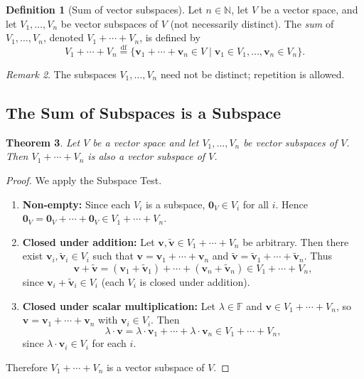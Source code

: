 \documentclass[11pt, a4paper, notitlepage]{report}
\newtheorem{theorem}{Theorem}[section]
\theoremstyle{definition}
\newtheorem{definition}[theorem]{Definition}
\theoremstyle{remark}
\newtheorem{remark}[theorem]{Remark}
\begin{document}
\begin{definition}[Sum of vector subspaces]\label{def:sum-subspaces}
Let $n \in \mathbb{N}$, let $V$ be a vector space, and let $V_1, \ldots, V_n$ be vector subspaces of $V$ (not necessarily distinct). The \emph{sum} of $V_1, \ldots, V_n$, denoted $V_1 + \cdots + V_n$, is defined by
\[
  V_1 + \cdots + V_n \stackrel{\mathrm{df}}{=} \{\mathbf{v}_1 + \cdots + \mathbf{v}_n \in V \mid \mathbf{v}_1 \in V_1, \ldots, \mathbf{v}_n \in V_n\}.
\]
\end{definition}

\begin{remark}
The subspaces $V_1, \ldots, V_n$ need not be distinct; repetition is allowed.
\end{remark}

\subsection{The Sum of Subspaces is a Subspace}

\begin{theorem}\label{thm:sum-is-subspace}
Let $V$ be a vector space and let $V_1, \ldots, V_n$ be vector subspaces of $V$. Then $V_1 + \cdots + V_n$ is also a vector subspace of $V$.
\end{theorem}

\begin{proof}
We apply the Subspace Test.
\begin{enumerate}
  \item \textbf{Non-empty:} Since each $V_i$ is a subspace, $\mathbf{0}_V \in V_i$ for all $i$. Hence $\mathbf{0}_V = \mathbf{0}_V + \cdots + \mathbf{0}_V \in V_1 + \cdots + V_n$.
  \item \textbf{Closed under addition:} Let $\mathbf{v}, \tilde{\mathbf{v}} \in V_1 + \cdots + V_n$ be arbitrary. Then there exist $\mathbf{v}_i, \tilde{\mathbf{v}}_i \in V_i$ such that $\mathbf{v} = \mathbf{v}_1 + \cdots + \mathbf{v}_n$ and $\tilde{\mathbf{v}} = \tilde{\mathbf{v}}_1 + \cdots + \tilde{\mathbf{v}}_n$. Thus
  \[
    \mathbf{v} + \tilde{\mathbf{v}} = (\mathbf{v}_1 + \tilde{\mathbf{v}}_1) + \cdots + (\mathbf{v}_n + \tilde{\mathbf{v}}_n) \in V_1 + \cdots + V_n,
  \]
  since $\mathbf{v}_i + \tilde{\mathbf{v}}_i \in V_i$ (each $V_i$ is closed under addition).
  \item \textbf{Closed under scalar multiplication:} Let $\lambda \in \mathbb{F}$ and $\mathbf{v} \in V_1 + \cdots + V_n$, so $\mathbf{v} = \mathbf{v}_1 + \cdots + \mathbf{v}_n$ with $\mathbf{v}_i \in V_i$. Then
  \[
    \lambda \cdot \mathbf{v} = \lambda \cdot \mathbf{v}_1 + \cdots + \lambda \cdot \mathbf{v}_n \in V_1 + \cdots + V_n,
  \]
  since $\lambda \cdot \mathbf{v}_i \in V_i$ for each $i$.
\end{enumerate}
Therefore $V_1 + \cdots + V_n$ is a vector subspace of $V$.
\end{proof}
\end{document}
